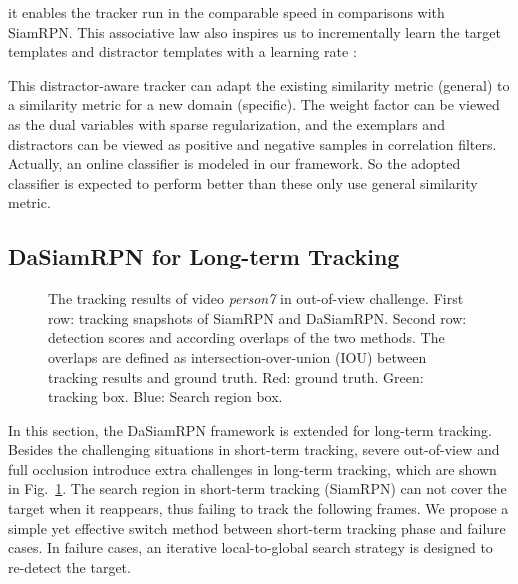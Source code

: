 \documentclass[runningheads]{llncs}
\begin{document}
it enables the tracker run in the comparable speed in comparisons with SiamRPN. This associative law also inspires us to incrementally learn the target templates and distractor templates with a learning rate :

This distractor-aware tracker can adapt the existing similarity metric (general) to a similarity metric for a new domain (specific).
The weight factor  can be viewed as the dual variables with sparse regularization, and the exemplars and distractors can be viewed as positive and negative samples in correlation filters. Actually, an online classifier is modeled in our framework. So the adopted classifier is expected to perform better than these only use general similarity metric.


\subsection{DaSiamRPN for Long-term Tracking}





\begin{figure}[t]
\centering
{}
\caption{The tracking results of video \emph{person7} in out-of-view challenge.
 First row: tracking snapshots of SiamRPN and DaSiamRPN. Second row: detection scores and according overlaps of the two methods. The overlaps are defined as intersection-over-union (IOU) between tracking results and ground truth. \color{red} Red: ground truth. \color{green} Green: tracking box.  \color{blue} Blue: Search region box.}
 \label{out-of-view}

\end{figure}

In this section, the DaSiamRPN framework is extended for long-term tracking. Besides the challenging situations in short-term tracking, severe out-of-view and full occlusion introduce extra challenges in long-term tracking, which are shown in Fig.~\ref{out-of-view}. The search region in short-term tracking (SiamRPN) can not cover the target when it reappears, thus failing to track the following frames.
We propose a simple yet effective switch method between short-term tracking phase and failure cases. In failure cases, an iterative local-to-global search strategy is designed to re-detect the target.
\end{document}
